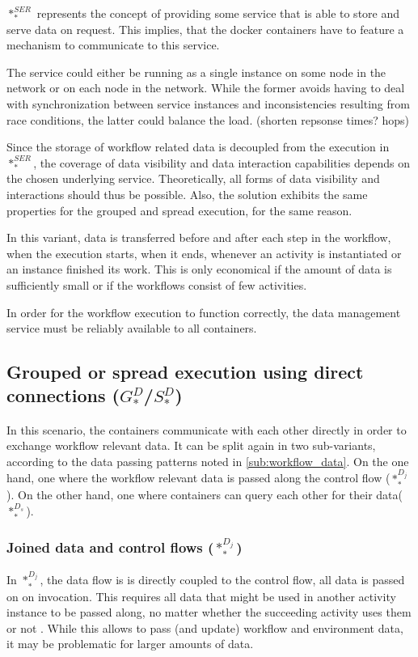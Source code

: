   $*_{*}^{SER}$ represents the concept of providing some service that is able to store and serve data on request. This implies, that the docker containers have to feature a mechanism to communicate to this service.

  The service could either be running as a single instance on some node in the network or on each node in the network. While the former avoids having to deal with synchronization between service instances and inconsistencies resulting from race conditions, the latter could balance the load. (shorten repsonse times? hops)

  Since the storage of workflow related data is decoupled from the execution in $*_{*}^{SER}$, the coverage of data visibility and data interaction capabilities depends on the chosen underlying service. Theoretically, all forms of data visibility and interactions should thus be possible. Also, the solution exhibits the same properties for the grouped and spread execution, for the same reason.

  In this variant, data is transferred before and after each step in the workflow, \ie when the execution starts, when it ends, whenever an activity is instantiated or an instance finished its work. This is only economical if the amount of data is sufficiently small or if the workflows consist of few activities.

  In order for the workflow execution to function correctly, the data management service must be reliably available to all containers.

\subsection[Grouped or spread execution using direct connections]{Grouped or spread execution using direct connections ($G_{*}^{D}$/$S_{*}^{D}$)} %
\label{sub:grouped_execution_using_direct_connections}

  In this scenario, the containers communicate with each other directly in order to exchange workflow relevant data. It can be split again in two sub-variants, according to the data passing patterns noted in \ref{sub:workflow_data}. On the one hand, one where the workflow relevant data is passed along the control flow ($*_{*}^{D_j}$). On the other hand, one where containers can query each other for their data($*_{*}^{D_s}$).

  \subsubsection{Joined data and control flows ($*_{*}^{D_j}$)} %
    In $*_{*}^{D_j}$, the data flow is is directly coupled to the control flow, \ie all data is passed on on invocation. This requires all data that might be used in another activity instance to be passed along, no matter whether the succeeding activity uses them or not \cite{Russell2005Workflow}. While this allows to pass (and update) workflow and environment data, it may be problematic for larger amounts of data.

